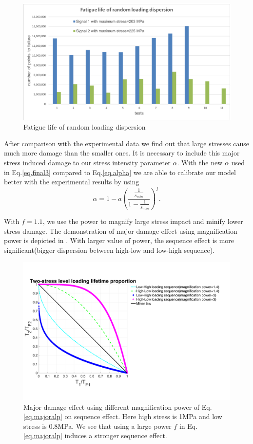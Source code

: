 \begin{figure}[!h]
	\centering
	\includegraphics[width=\textwidth]{figures//randomdispersion.png} 
	\caption{Fatigue life of random loading dispersion}
	\label{fig.randomdispersion}
\end{figure}

After comparison with the experimental data we find out that large stresses cause much more damage than the smaller ones. It is necessary to include this major stress induced damage to our stress intensity parameter $\alpha$. With the new $\alpha$ used in Eq.\eqref{eq.final3} compared to Eq.\eqref{eq.alpha} we are able to calibrate our model better with the experimental results by using 
\begin{equation}
\alpha=1-a\left(  \dfrac{\frac{1}{s_{min}}}{1-\frac{1}{s_{min}}} \right) ^{f}.
\label{eq.majoralp}
\end{equation}


With $f=1.1$, we use the power to magnify large stress impact and minify lower stress damage.  The demonstration of major damage effect using magnification power is depicted in . With larger value of power, the sequence effect is more significant(bigger dispersion between high-low and low-high sequence).

\begin{figure}[!h]
\centering
\includegraphics[width=\textwidth]{figures//sequence_ours.png} 
\caption{Major damage effect using different magnification power of Eq.\eqref{eq.majoralp} on sequence effect. Here high stress is 1MPa and low stress is 0.8MPa. We see that using a large power $f$ in Eq.\eqref{eq.majoralp} induces a stronger sequence effect.}
\label{fig.sequenceours}
\end{figure}

